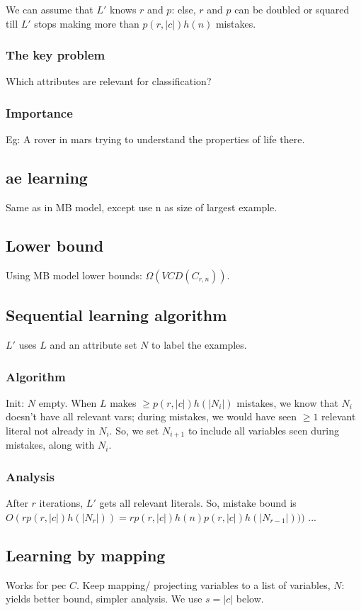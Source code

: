 \documentclass[oneside, article]{memoir}
\begin{document}
We can assume that $L'$  knows $r$ and $p$: else, $r$ and $p$ can be doubled or squared till $L'$  stops making more than $p(r, |c|)h(n)$ mistakes.

\subsubsection{The key problem}
Which attributes are relevant for classification?

\subsubsection{Importance}
Eg: A rover in mars trying to understand the properties of life there.

\subsection{ae learning}
Same as in MB model, except use n as size of largest example.

\subsection{Lower bound}
Using MB model lower bounds: $\Omega(VCD(C_{r,n}))$.

\subsection{Sequential learning algorithm}
$L'$  uses $L$ and an attribute set $N$ to label the examples.

\subsubsection{Algorithm}
Init: $N$ empty. When $L$ makes $\geq p(r, |c|)h(|N_i|)$ mistakes, we know that $N_i$ doesn't have all relevant vars; during mistakes, we would have seen $\geq 1$ relevant literal not already in $N_{i}$. So, we set $N_{i+1}$ to include all variables seen during mistakes, along with $N_i$.

\subsubsection{Analysis}
After $r$ iterations, $L'$ gets all relevant literals. So, mistake bound is $O(rp(r, |c|)h(|N_r|)) = rp(r, |c|)h(n)p(r, |c|)h(|N_{r-1}|)))$ ...

\subsection{Learning by mapping}
Works for pec $C$. Keep mapping/ projecting variables to a list of variables, $N$: yields better bound, simpler analysis. We use $s = |c|$ below.
\end{document}
